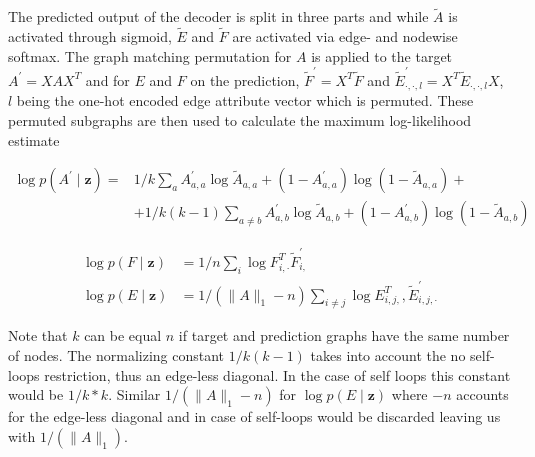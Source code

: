 

The predicted output of the decoder is split in three parts and while $\tilde{A}$ is activated through sigmoid, $\tilde{E}$ and $\tilde{F}$ are activated via edge- and nodewise softmax. The graph matching permutation for $A$ is applied to the target $A^{\prime}=X A X^{T}$ and for $E$ and $F$ on the prediction, $\widetilde{F}^{\prime}=X^{T} \widetilde{F}$ and $\widetilde{E}_{\cdot, \cdot, l}^{\prime}=X^{T} \widetilde{E}_{\cdot, \cdot, l} X$, $l$ being the one-hot encoded edge attribute vector which is permuted. These permuted subgraphs are then used to calculate the maximum log-likelihood estimate \cite{simonovsky_graphvae_2018}

\begin{equation}
    \begin{split}
        \log p\left(A^{\prime} \mid \mathbf{z}\right) = &1 / k \sum_{a} A_{a, a}^{\prime} \log \widetilde{A}_{a, a}+\left(1-A_{a, a}^{\prime}\right) \log \left(1-\widetilde{A}_{a, a}\right)+ \\ & +1 / k(k-1) \sum_{a \neq b} A_{a, b}^{\prime} \log \widetilde{A}_{a, b}+\left(1-A_{a, b}^{\prime}\right) \log \left(1-\widetilde{A}_{a, b}\right)
    \end{split}
    \label{eq3:GAVElossA}
\end{equation}

\begin{align}
    \log p(F \mid \mathbf{z}) &=1 / n \sum_{i} \log F_{i, \cdot}^{T} \widetilde{F}_{i,}^{\prime} \\
    \log p(E \mid \mathbf{z}) &=1 /\left(\|A\|_{1}-n\right) \sum_{i \neq j} \log E_{i, j,}^{T}, \widetilde{E}_{i, j, \cdot}^{\prime}
    \label{eq3:GAVElossEF}
\end{align}

Note that $k$ can be equal $n$ if target and prediction graphs have the same number of nodes. The normalizing constant $1 / k(k-1)$ takes into account the no self-loops restriction, thus an edge-less diagonal. In the case of self loops this constant would be $1 / k*k$. Similar $1 /\left(\|A\|_{1}-n\right)$ for $\log p(E \mid \mathbf{z})$ where $-n$ accounts for the edge-less diagonal and in case of self-loops would be discarded leaving us with $1 /\left(\|A\|_{1}\right)$.

